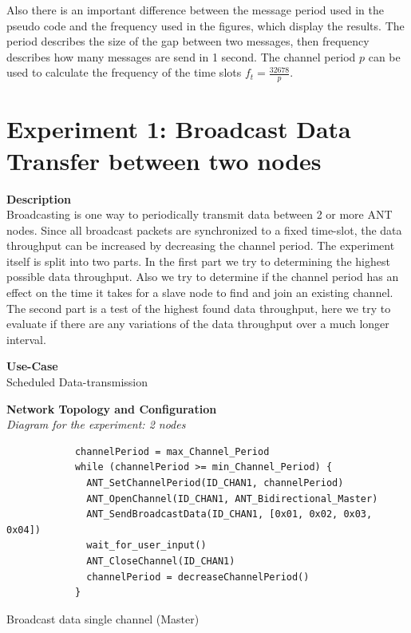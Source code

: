 Also there is an important difference between the message period used in the pseudo code and the frequency used in the figures, which display the results. The period describes the size of the gap between two messages, then frequency describes how many messages are send in 1 second. The channel period $p$ can be used to calculate the frequency of the time slots $f_t = \frac{32678}{p}$.  

\newpage


\section{Experiment 1: Broadcast Data Transfer between two nodes}
\begin{description} 
	\item{\textbf{Description}} \hfill \\ Broadcasting is one way to periodically transmit data between 2 or more ANT nodes. Since all broadcast packets are synchronized to a fixed time-slot, the data throughput can be increased by decreasing the channel period. The experiment itself is split into two parts. In the first part we try to determining the highest possible data throughput. Also we try to determine if the channel period has an effect on the time it takes for a slave node to find and join an existing channel. The second part is a test of the highest found data throughput, here we try to evaluate if there are any variations of the data throughput over a much longer interval.	
	\item{\textbf{Use-Case}} \hfill \\ Scheduled Data-transmission	
	\item{\textbf{Network Topology and Configuration}} \hfill \\ \textit{Diagram for the experiment:  2 nodes} \\
		\begin{code}[H]
			\begin{verbatim}
			channelPeriod = max_Channel_Period
			while (channelPeriod >= min_Channel_Period) {
			  ANT_SetChannelPeriod(ID_CHAN1, channelPeriod)
			  ANT_OpenChannel(ID_CHAN1, ANT_Bidirectional_Master)
			  ANT_SendBroadcastData(ID_CHAN1, [0x01, 0x02, 0x03, 0x04])
			  wait_for_user_input()
			  ANT_CloseChannel(ID_CHAN1)
			  channelPeriod = decreaseChannelPeriod()
			}
			\end{verbatim}
			\caption{Broadcast data single channel (Master)}\label{lst:mExp1}
		\end{code}
		

\end{description}
